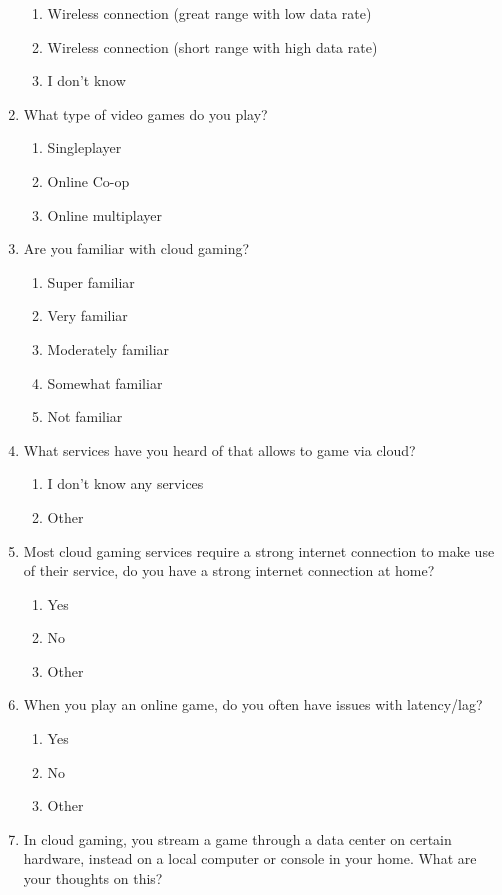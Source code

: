 \begin{enumerate}
\begin{enumerate}
		\item Wireless connection (great range with low data rate)
		\item Wireless connection (short range with high data rate)
		\item I don't know
	\end{enumerate}
	\item What type of video games do you play?
	\begin{enumerate}
		\item Singleplayer
		\item Online Co-op
		\item Online multiplayer
	\end{enumerate}
\item Are you familiar with cloud gaming?
\begin{enumerate}
	\item Super familiar
	\item Very familiar
	\item Moderately familiar
	\item Somewhat familiar
	\item Not familiar
\end{enumerate}
\item What services have you heard of that allows to game via cloud?
\begin{enumerate}
	\item I don't know any services
	\item Other
\end{enumerate}
	\item Most cloud gaming services require a strong internet connection to make use of their service, do you have a strong internet connection at home?
	\begin{enumerate}
		\item Yes
		\item No
		\item Other
	\end{enumerate}
	\item When you play an online game, do you often have issues with latency/lag?
	\begin{enumerate}
		\item Yes
		\item No
		\item Other
	\end{enumerate}
	\item In cloud gaming, you stream a game through a data center on certain hardware, instead on a local computer or console in your home. What are your thoughts on this?

\end{enumerate}
